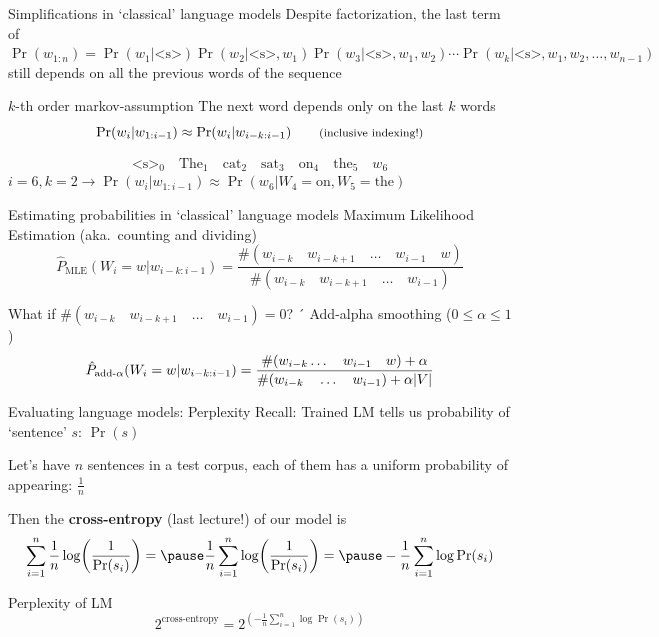 \documentclass[12pt,aspectratio=169,handout]{beamer}
\begin{document}
\begin{frame}{Simplifications in `classical' language models}
	Despite factorization, the last term of
	$
	\Pr(w_{1:n}) = \Pr(w_1 | \text{<s>}) \Pr (w_2 | \text{<s>}, w_1) \Pr(w_3 | \text{<s>}, w_1, w_2) \cdots \Pr(w_k | \text{<s>}, w_1, w_2, \ldots, w_{n-1})
	$
	still depends on all the previous words of the sequence
	
	\begin{block}{$k$-th order markov-assumption}
		The next word depends only on the last $k$ words
		$$
		\Pr(w_{i} | w_{1:i-1}) \approx \Pr (w_{i} | w_{i-k:i-1}) \qquad \text{\footnotesize{(inclusive indexing!)}}
		$$
	\end{block}
	\pause
	$$
	\text{<s>}_0 \quad \text{The}_1 \quad \text{cat}_2 \quad \text{sat}_3 \quad \text{on}_4 \quad \text{the}_5 \quad w_6
	$$
	$i = 6, k=2 \to \Pr(w_{i} | w_{1:i-1}) \approx \Pr(w_6 | W_4 = \text{on}, W_5 = \text{the})$
\end{frame}

\begin{frame}{Estimating probabilities in `classical' language models}
	Maximum Likelihood Estimation (aka.\ counting and dividing)
	$$
	\hat{P}_{\text{MLE}}(W_i = w | w_{i - k:i - 1}) = \frac{\#(w_{i-k} \quad w_{i-k+1} \quad \ldots \quad w_{i-1} \quad w)}{\#(w_{i-k} \quad w_{i-k+1} \quad \ldots \quad w_{i-1})}
	$$
	\begin{block}{What if $\#(w_{i-k} \quad w_{i-k+1} \quad \ldots \quad w_{i-1}) = 0$?}
		\pause´
		Add-alpha smoothing ($0 \leq \alpha \leq 1$)
		$$
		\hat{P}_{\text{add-}\alpha}(W_i = w | w_{i - k:i - 1}) =
		\frac{\#(w_{i-k} \ldots \quad w_{i-1} \quad w) + \alpha}
		{\#(w_{i-k} \quad \ldots \quad w_{i-1}) + \alpha \abs{V}}
		$$
	\end{block}
	
\end{frame}


\begin{frame}{Evaluating language models: Perplexity}
	Recall: Trained LM tells us probability of `sentence' $s$: $\Pr(s)$
	
	\pause
	Let's have $n$ sentences in a test corpus, each of them has a uniform probability of appearing: $\frac{1}{n}$
	
	\pause
	Then the \textbf{cross-entropy} (last lecture!) of our model is
	$$
	\sum_{i = 1}^{n} \frac{1}{n} \log (\frac{1}{\Pr(s_i)}) = \pause
	\frac{1}{n} \sum_{i = 1}^{n} \log (\frac{1}{\Pr(s_i)}) = \pause
	- \frac{1}{n} \sum_{i = 1}^{n} \log \Pr(s_i)
	$$
	\pause \begin{block}{Perplexity of LM}
		$$
		2^{\text{cross-entropy}} = 
		2^{\left(- \frac{1}{n} \sum_{i = 1}^{n} \log \Pr(s_i)\right)}
		$$
	\end{block}
	
\end{frame}
\end{document}
